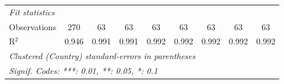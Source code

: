 \begin{table}[htbp]
\begin{tabular}{lcccccccc}
      \midrule \emph{Fit statistics}\\
      Observations                                            & 270            & 63      & 63      & 63          & 63          & 63           & 63          & 63\\  
      R$^2$                                                   & 0.946          & 0.991   & 0.991   & 0.992       & 0.992       & 0.992        & 0.992       & 0.992\\  
      \midrule
      \multicolumn{9}{l}{\emph{Clustered (Country) standard-errors in parentheses}}\\
      \multicolumn{9}{l}{\emph{Signif. Codes: ***: 0.01, **: 0.05, *: 0.1}}\\
   \end{tabular}
\end{table}


